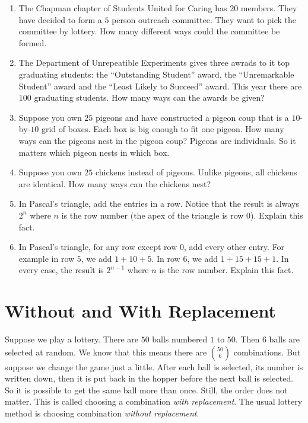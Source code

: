 				\begin{exercises}
					\begin{enumerate}
						\item The Chapman chapter of Students United for Caring has $20$ members.
						They have decided to form a $5$ person outreach committee. They want to pick the committee by lottery. How many different ways could the committee be formed.
						\item The Department of Unrepeatible Experiments gives three awrads to it top graduating students: the ``Outstanding Student'' award, the ``Unremarkable Student'' award and the ``Least Likely to Succeed'' award. 
						This year there are $100$ graduating students. How many ways can the awards be given?
						\item Suppose you own $25$ pigeons and have constructed a pigeon coup that is a $10$-by-$10$ grid of boxes. 
						Each box is big enough to fit one pigeon.
						How many ways can the pigeons nest in the pigeon coup? 
						Pigeons are individuals. So it matters which pigeon nests in which box.
						\item Suppose you own $25$ chickens instead of pigeons. 
						Unlike pigeons, all chickens are identical.
						How many ways can the chickens nest?
						\item In Pascal's triangle, add the entries in a row. Notice that the result is always $2^n$ where $n$ is the row number (the apex of the triangle is row $0$). Explain this fact.
						\item In Pascal's triangle, for any row except row $0$, add every other entry. For example in row $5$, we add $1+10+5$. In row $6$, we add $1+15+15+1$. In every case, the result is $2^{n-1}$ where $n$ is the row number. Explain this fact.
					\end{enumerate}
				\end{exercises}
				
				\section{Without and With Replacement}
				
				Suppose we play a lottery. 
				There are $50$ balls numbered $1$ to $50$.
				Then $6$ balls are selected at random. We know that this means there are $\binom{50}{6}$ combinations. But suppose we change the game just a little. After each ball is selected, its number is written down, then it is put back in the hopper before the next ball is selected. So it is possible to get the same ball more than once. Still, the order does not matter. This is called choosing a combination \emph{with replacement}. The usual lottery method is choosing combination \emph{without replacement}.
				
